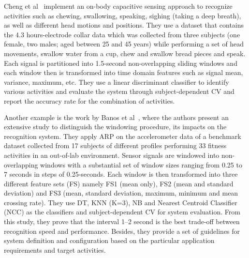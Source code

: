Cheng et al~\cite{cheng2010active} implement an on-body capacitive sensing approach to recognize activities such as chewing, swallowing, speaking, sighing (taking a deep breath), as well as
different head motions and positions. They use a dataset that contains the 4.3 hours-electrode collar data which was collected from three subjects (one female, two males; aged between 25 and 45 years) while performing a set of head movements, swallow water from a cup, chew and swallow bread pieces and speak. Each signal is partitioned into 1.5-second non-overlapping sliding windows and each window then is transformed into time domain features such as signal mean, variance, maximum, etc. They use a linear discriminant
classifier to identify various activities and evaluate the system through subject-dependent CV and report the accuracy rate for the combination of activities.  

Another example is the work by Banos et al~\cite{banos2014window}, where the authors present an extensive study to distinguish the windowing procedure, its impacts on the recognition system. They apply ARP on the accelerometer data of a benchmark dataset collected from 17 subjects of different profiles performing 33 fitness activities in an out-of-lab environment. Sensor signals are windowed into non-overlapping windows with a substantial set of window sizes ranging from 0.25 to 7 seconds in steps of 0.25-seconds. Each window is then transformed into three different feature sets (FS) namely FS1 (mean only), FS2 (mean and standard deviation) and FS3 (mean, standard deviation, maximum, minimum and mean crossing rate). They use DT, KNN (K=3), NB and Nearest Centroid Classifier (NCC) as the classifiers and subject-dependent CV for system evaluation. From this study, they prove that the interval 1–2 second is the best trade-off between recognition speed and performance. Besides, they provide a set of guidelines for system definition and configuration based on the particular application requirements and target activities.